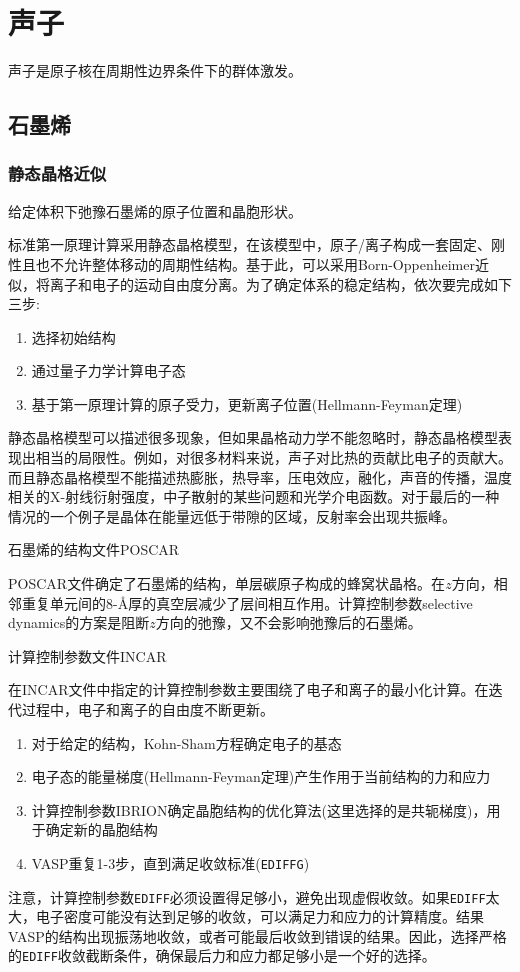 \section{声子}
声子是原子核在周期性边界条件下的群体激发。

\subsection{石墨烯}
\subsubsection{静态晶格近似}

给定体积下弛豫石墨烯的原子位置和晶胞形状。

标准第一原理计算采用静态晶格模型，在该模型中，原子/离子构成一套固定、刚性且也不允许整体移动的周期性结构。基于此，可以采用\textrm{Born-Oppenheimer}近似，将离子和电子的运动自由度分离。为了确定体系的稳定结构，依次要完成如下三步:
\begin{enumerate}
	\item 选择初始结构
	\item 通过量子力学计算电子态
	\item 基于第一原理计算的原子受力，更新离子位置(\textrm{Hellmann-Feyman}定理)
\end{enumerate}
静态晶格模型可以描述很多现象，但如果晶格动力学不能忽略时，静态晶格模型表现出相当的局限性。例如，对很多材料来说，声子对比热的贡献比电子的贡献大。而且静态晶格模型不能描述热膨胀，热导率，压电效应，融化，声音的传播，温度相关的\textrm{X}-射线衍射强度，中子散射的某些问题和光学介电函数。对于最后的一种情况的一个例子是晶体在能量远低于带隙的区域，反射率会出现共振峰。

石墨烯的结构文件\textrm{POSCAR}

\textrm{POSCAR}文件确定了石墨烯的结构，单层碳原子构成的蜂窝状晶格。在$z$方向，相邻重复单元间的\textrm{8-\AA}厚的真空层减少了层间相互作用。计算控制参数\textrm{selective dynamics}的方案是阻断$z$方向的弛豫，又不会影响弛豫后的石墨烯。

计算控制参数文件\textrm{INCAR}

在\textrm{INCAR}文件中指定的计算控制参数主要围绕了电子和离子的最小化计算。在迭代过程中，电子和离子的自由度不断更新。
\begin{enumerate}
	\item 对于给定的结构，\textrm{Kohn-Sham}方程确定电子的基态
	\item 电子态的能量梯度(\textrm{Hellmann-Feyman}定理)产生作用于当前结构的力和应力
	\item 计算控制参数\textrm{IBRION}确定晶胞结构的优化算法(这里选择的是共轭梯度)，用于确定新的晶胞结构
	\item \textrm{VASP}重复1-3步，直到满足收敛标准(\texttt{EDIFFG})
\end{enumerate}
注意，计算控制参数\texttt{EDIFF}必须设置得足够小，避免出现虚假收敛。如果\texttt{EDIFF}太大，电子密度可能没有达到足够的收敛，可以满足力和应力的计算精度。结果\textrm{VASP}的结构出现振荡地收敛，或者可能最后收敛到错误的结果。因此，选择严格的\texttt{EDIFF}收敛截断条件，确保最后力和应力都足够小是一个好的选择。

